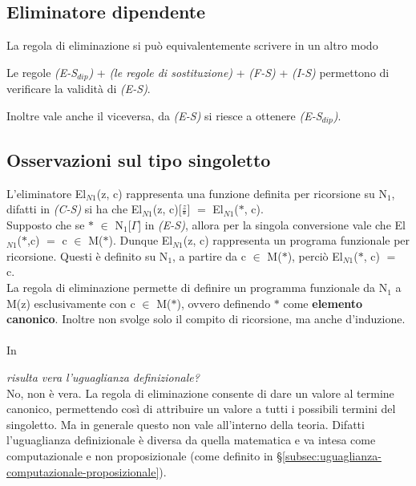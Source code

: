 \subsection{Eliminatore dipendente}
\label{subsec:eliminatore dipendente-singoletto}
La regola di eliminazione si pu\`o equivalentemente scrivere in un altro modo
\begin{prooftree}
\end{prooftree}
Le regole \textit{(E-S$_{dip}$)} + \textit{(le regole di sostituzione)} + \textit{(F-S)} + \textit{(I-S)} permettono di verificare la validit\`a di \textit{(E-S)}.
\begin{prooftree}
\end{prooftree}
\noindent
Inoltre vale anche il viceversa, da \textit{(E-S)} si riesce a ottenere \textit{(E-S$_{dip}$)}.
\subsection{Osservazioni sul tipo singoletto}
\label{subsec:osservazioni-singoletto}
L'eliminatore El$_{N1}$(z, c) rappresenta una funzione definita per ricorsione su N$_1$, difatti in \textit{(C-S)} si ha che El$_{N1}$(z, c)[$\frac{z}{\ast}$] $=$ El$_{N1}$($\ast$, c).\\
Supposto che se $\ast$ $\in$ N$_1$[$\Gamma$] in \textit{(E-S)}, allora per la singola conversione vale che El$_{N1}$($\ast$,c) $=$ c $\in$ M($\ast$).
Dunque El$_{N1}$(z, c) rappresenta un programa funzionale per ricorsione. Questi \`e definito su N$_1$, a partire da c $\in$ M($\ast$), perci\`o El$_{N1}$($\ast$, c) $=$ c.\\
La regola di eliminazione permette di definire un programma funzionale da N$_1$ a M(z) esclusivamente con c $\in$ M($\ast$), ovvero definendo $\ast$ come \textbf{elemento canonico}. Inoltre non svolge solo il compito di ricorsione, ma anche d'induzione.
\\\\
In \begin{prooftree}
\end{prooftree}
\textit{risulta vera l'uguaglianza definizionale?}\\
No, non \`e vera. La regola di eliminazione consente di dare un valore al termine canonico, permettendo cos\`i di attribuire un valore a tutti i possibili termini del singoletto. Ma in generale questo non vale all'interno della teoria. Difatti l'uguaglianza definizionale \`e diversa da quella matematica e va intesa come computazionale e non proposizionale (come definito in \S \ref{subsec:uguaglianza-computazionale-proposizionale}).

